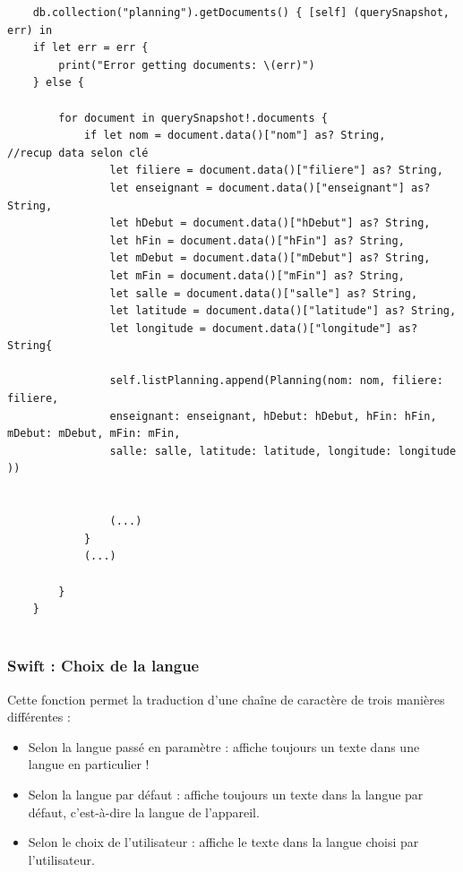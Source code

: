 \documentclass{article}
\begin{document}
\begin{verbatim}
    db.collection("planning").getDocuments() { [self] (querySnapshot, err) in
    if let err = err {
        print("Error getting documents: \(err)")
    } else {
        
        for document in querySnapshot!.documents {
            if let nom = document.data()["nom"] as? String,         //recup data selon clé
                let filiere = document.data()["filiere"] as? String,
                let enseignant = document.data()["enseignant"] as? String,
                let hDebut = document.data()["hDebut"] as? String,
                let hFin = document.data()["hFin"] as? String,
                let mDebut = document.data()["mDebut"] as? String,
                let mFin = document.data()["mFin"] as? String,
                let salle = document.data()["salle"] as? String,
                let latitude = document.data()["latitude"] as? String,
                let longitude = document.data()["longitude"] as? String{
            
                self.listPlanning.append(Planning(nom: nom, filiere: filiere,
                enseignant: enseignant, hDebut: hDebut, hFin: hFin, mDebut: mDebut, mFin: mFin,
                salle: salle, latitude: latitude, longitude: longitude ))
                

                (...)
            }
            (...)
            
        }   
    }


\end{verbatim}




\newpage %




\subsubsection{Swift : Choix de la langue}
Cette fonction permet la traduction d'une chaîne de caractère de trois manières différentes :

\begin{itemize}
    \item Selon la langue passé en paramètre : affiche toujours un texte dans une langue en particulier ! 

    \item Selon la langue par défaut : affiche toujours un texte dans la langue par défaut, c'est-à-dire la langue de l'appareil.

    \item Selon le choix de l'utilisateur : affiche le texte dans la langue choisi par l'utilisateur.
\end{itemize}
\end{document}
